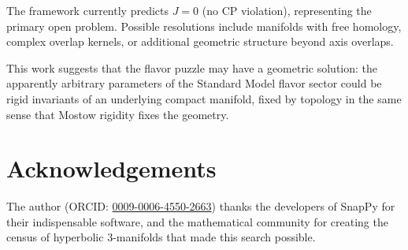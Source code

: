 \documentclass[11pt,a4paper]{article}
\begin{document}
The framework currently predicts $J = 0$ (no CP violation), 
representing the primary open problem. Possible resolutions include 
manifolds with free homology, complex overlap kernels, or additional 
geometric structure beyond axis overlaps.

This work suggests that the flavor puzzle may have a geometric 
solution: the apparently arbitrary parameters of the Standard Model 
flavor sector could be rigid invariants of an underlying compact 
manifold, fixed by topology in the same sense that Mostow rigidity 
fixes the geometry.

\section*{Acknowledgements}
The author (ORCID: \href{https://orcid.org/0009-0006-4550-2663}{0009-0006-4550-2663})
thanks the developers of SnapPy for their indispensable
software, and the mathematical community for creating the census of
hyperbolic 3-manifolds that made this search possible.
\end{document}
